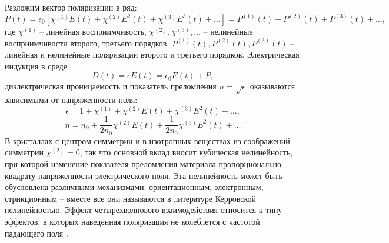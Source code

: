 Разложим вектор поляризации в ряд:
%
\begin{equation}
P(t)=\epsilon_0[\chi^{(1)}E(t)+\chi^{(2)}E^2(t)+\chi^{(3)}E^3(t)+\dots] =P^{(1)}(t)+P^{(2)}(t)+P^{(3)}(t)+\dots,
\end{equation}
%
где $\chi^{(1)}$ -- линейная восприимчивость, $\chi^{(2)},\chi^{(3)},\dots$ -- нелинейные восприимчивости второго, третьего порядков. $P^{(1)}(t),P^{(2)}(t),P^{(3)}(t)$ -- линейная и нелинейные поляризации второго и третьего порядков. Электрическая индукция в среде
%
\begin{equation}
D(t)=\epsilon E(t)=\epsilon_0E(t)+P,
\end{equation}
%
диэлектрическая проницаемость и показатель преломления $n=\sqrt{\epsilon}$ оказываются зависимыми от напряженности поля:
%
\begin{equation}
\epsilon=1+\chi^{(1)}+\chi^{(2)}E(t)+\chi^{(3)}E^2(t)+\dots,
\end{equation}
\begin{equation}
n=n_0+\frac{1}{2n_0}\chi^{(2)}E(t)+\frac{1}{2n_0}\chi^{(3)}E^2(t)+\dots
\end{equation}
%
В кристаллах с центром симметрии и в изотропных веществах из соображений симметрии $\chi^{(2)}=0$, так что основной вклад вносит кубическая нелинейность, при которой изменение показателя преломления материала пропорционально квадрату напряженности электрического поля. Эта нелинейность может быть обусловлена различными механизмами: ориентационным, электронным, стрикционным -- вместе все они называются в литературе Керровской нелинейностью. Эффект четырехволнового взаимодействия относится к типу эффектов, в которых наведенная поляризация не колеблется с частотой падающего поля \cite{Gorodetsky}.

